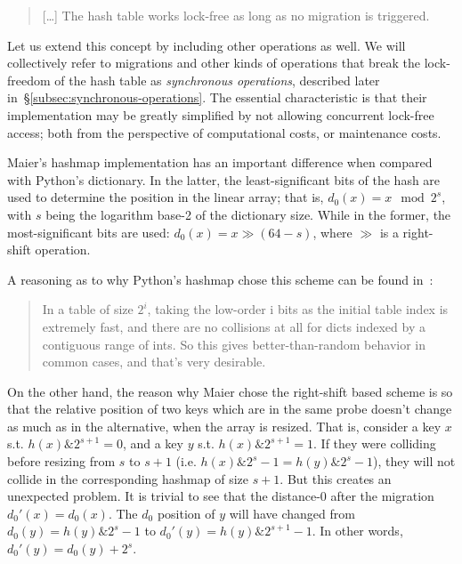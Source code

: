 \begin{quote}
	[\ldots] The hash table works lock-free as long as no migration is triggered.
\end{quote}

Let us extend this concept by including other operations as well.
We will collectively refer to migrations and other kinds of operations that break the lock-freedom of the hash table as \emph{synchronous operations}, described later in~\S\ref{subsec:synchronous-operations}.
The essential characteristic is that their implementation may be greatly simplified by not allowing concurrent lock-free access; both from the perspective of computational costs, or maintenance costs.

Maier's hashmap implementation has an important difference when compared with Python's dictionary.
In the latter, the least-significant bits of the hash are used to determine the position in the linear array; that is, $d_0(x) = x \mod 2^s$, with $s$ being the logarithm base-2 of the dictionary size.
While in the former, the most-significant bits are used: $d_0(x) = x \gg (64 - s)$, where $\gg$ is a right-shift operation.

A reasoning as to why Python's hashmap chose this scheme can be found in~\cite{dict-comment-hash}:
\begin{quote}
	In a table of size $2^i$, taking the low-order i bits as the initial table index is extremely fast, and there
	are no collisions at all for dicts indexed by a contiguous range of ints.
	So this gives better-than-random behavior in common cases, and that's very desirable.
\end{quote}
On the other hand, the reason why Maier chose the right-shift based scheme is so that the relative position of two keys which are in the same probe doesn't change as much as in the alternative, when the array is resized.
That is, consider a key $x$ s.t. $h(x) \mathbin{\&} 2^{s + 1} = 0$, and a key $y$ s.t. $h(x) \mathbin{\&} 2^{s + 1} = 1$.
If they were colliding before resizing from $s$ to $s + 1$ (i.e. $h(x) \mathbin{\&} 2^s - 1 = h(y) \mathbin{\&} 2^s - 1$), they will not collide in the corresponding hashmap of size $s + 1$.
But this creates an unexpected problem.
It is trivial to see that the distance-0 after the migration $d_0'(x) = d_0(x)$.
The $d_0$ position of $y$ will have changed from $d_0(y) = h(y) \mathbin{\&} 2^s-1$ to $d_0'(y) = h(y) \mathbin{\&} 2^{s+1}-1$.
In other words, $d_0'(y) = d_0(y) + 2^s$.

